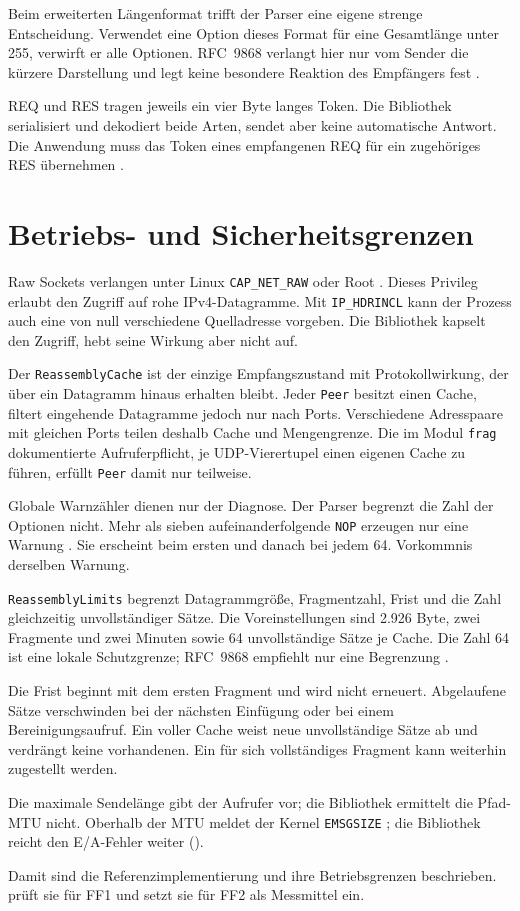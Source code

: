 Beim erweiterten Längenformat trifft der Parser eine eigene strenge Entscheidung. Verwendet eine
Option dieses Format für eine Gesamtlänge unter 255, verwirft er alle Optionen. RFC~9868
verlangt hier nur vom Sender die kürzere Darstellung und legt keine besondere Reaktion des Empfängers
fest \cite[Sec.~10]{rfc9868}.

REQ und RES tragen jeweils ein vier Byte langes Token. Die Bibliothek serialisiert und dekodiert beide
Arten, sendet aber keine automatische Antwort. Die Anwendung muss das Token eines empfangenen REQ für
ein zugehöriges RES übernehmen \cite[Sec.~11.7]{rfc9868}.

\section{Betriebs- und Sicherheitsgrenzen}
\label{sec:betriebsgrenzen}

Raw Sockets verlangen unter Linux \texttt{CAP\_NET\_RAW} oder Root
\cite{man7capabilities, man7raw}. Dieses Privileg erlaubt den Zugriff auf rohe IPv4-Datagramme. Mit
\texttt{IP\_HDRINCL} kann der Prozess auch eine von null verschiedene Quelladresse vorgeben. Die
Bibliothek kapselt den Zugriff, hebt seine Wirkung aber nicht auf.

Der \texttt{ReassemblyCache} ist der einzige Empfangszustand mit Protokollwirkung, der über ein Datagramm
hinaus erhalten bleibt.
Jeder \texttt{Peer} besitzt einen Cache, filtert eingehende Datagramme jedoch nur nach Ports.
Verschiedene Adresspaare mit gleichen Ports teilen deshalb Cache und Mengengrenze. Die im Modul
\texttt{frag} dokumentierte Aufruferpflicht, je UDP-Vierertupel einen eigenen Cache zu führen, erfüllt
\texttt{Peer} damit nur teilweise.

Globale Warnzähler dienen nur der Diagnose. Der Parser begrenzt die Zahl der Optionen nicht. Mehr als
sieben aufeinanderfolgende \texttt{NOP} erzeugen nur eine Warnung \cite[Sec.~11.2]{rfc9868}. Sie
erscheint beim ersten und danach bei jedem 64. Vorkommnis derselben Warnung.

\texttt{ReassemblyLimits} begrenzt Datagrammgröße, Fragmentzahl, Frist und die Zahl gleichzeitig
unvollständiger Sätze. Die Voreinstellungen sind 2.926 Byte, zwei Fragmente und zwei Minuten
\cite[Sec.~11.4 und 11.6]{rfc9868} sowie 64 unvollständige Sätze je Cache. Die Zahl 64 ist eine
lokale Schutzgrenze; RFC~9868 empfiehlt nur eine Begrenzung \cite[Sec.~11.4 und 25.4]{rfc9868}.

Die Frist beginnt mit dem ersten Fragment und wird nicht erneuert. Abgelaufene Sätze verschwinden bei
der nächsten Einfügung oder bei einem Bereinigungsaufruf. Ein voller Cache weist neue unvollständige
Sätze ab und verdrängt keine vorhandenen. Ein für sich vollständiges Fragment kann weiterhin
zugestellt werden.

Die maximale Sendelänge gibt der Aufrufer vor; die Bibliothek ermittelt die Pfad-MTU nicht. Oberhalb der MTU
meldet der Kernel \texttt{EMSGSIZE} \cite{man7raw}; die Bibliothek reicht den E/A-Fehler weiter
().

Damit sind die Referenzimplementierung und ihre Betriebsgrenzen beschrieben. 
prüft sie für FF1 und setzt sie für FF2 als Messmittel ein.
